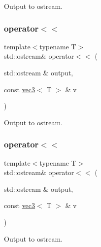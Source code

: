 Output to ostream. 

\mbox{\label{struct_space_h_1_1vec3_af5e1bcad9d3d484d6f4e6b3f8949f5cf}} 
\subsubsection{\texorpdfstring{operator$<$$<$}{operator<<}\hspace{0.1cm}{\footnotesize\ttfamily [2/4]}}
{\footnotesize\ttfamily template$<$typename T$>$ \\
std\+::ostream\& operator$<$$<$ (\begin{DoxyParamCaption}\item[{std\+::ostream \&}]{output,  }\item[{const \mbox{\hyperlink{struct_space_h_1_1vec3}{vec3}}$<$ T $>$ \&}]{v }\end{DoxyParamCaption})\hspace{0.3cm}{\ttfamily [friend]}}



Output to ostream. 

\mbox{\label{struct_space_h_1_1vec3_af5e1bcad9d3d484d6f4e6b3f8949f5cf}} 
\subsubsection{\texorpdfstring{operator$<$$<$}{operator<<}\hspace{0.1cm}{\footnotesize\ttfamily [3/4]}}
{\footnotesize\ttfamily template$<$typename T$>$ \\
std\+::ostream\& operator$<$$<$ (\begin{DoxyParamCaption}\item[{std\+::ostream \&}]{output,  }\item[{const \mbox{\hyperlink{struct_space_h_1_1vec3}{vec3}}$<$ T $>$ \&}]{v }\end{DoxyParamCaption})\hspace{0.3cm}{\ttfamily [friend]}}



Output to ostream. 

\mbox{\label{struct_space_h_1_1vec3_af5e1bcad9d3d484d6f4e6b3f8949f5cf}} 
